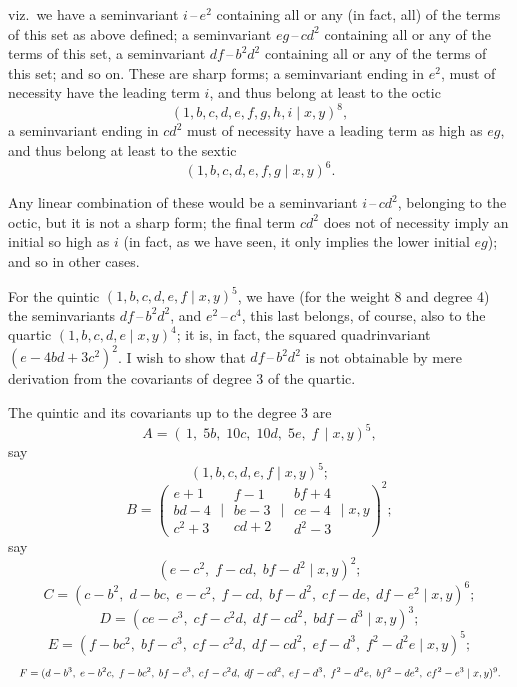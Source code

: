 \documentclass[11pt]{article}
\begin{document}
viz.\ we have a seminvariant $i\,\text{--}\,e^2$ containing all or any (in fact, all) of the terms of this set as above defined; a seminvariant $eg\,\text{--}\,cd^2$ containing all or any of the terms of this set, a seminvariant $df\,\text{--}\,b^2d^2$ containing all or any of the terms of this set; and so on. These are sharp forms; a seminvariant ending in $e^2$, must of necessity have the leading term $i$, and thus belong at least to the octic
\[ (1, b, c, d, e, f, g, h, i \mid x, y)^8, \]
a seminvariant ending in $cd^2$ must of necessity have a leading term as high as $eg$, and thus belong at least to the sextic
\[ (1, b, c, d, e, f, g \mid x, y)^6. \]

Any linear combination of these would be a seminvariant $i\,\text{--}\,cd^2$, belonging to the octic, but it is not a sharp form; the final term $cd^2$ does not of necessity imply an initial so high as $i$ (in fact, as we have seen, it only implies the lower initial $eg$); and so in other cases.

For the quintic $(1, b, c, d, e, f \mid x, y)^5$, we have (for the weight 8 and degree 4) the seminvariants $df\,\text{--}\,b^2d^2$, and $e^2\,\text{--}\,c^4$, this last belongs, of course, also to the quartic $(1, b, c, d, e \mid x, y)^4$; it is, in fact, the squared quadrinvariant $(e - 4bd + 3c^2)^2$. I wish to show that $df\,\text{--}\,b^2d^2$ is not obtainable by mere derivation from the covariants of degree 3 of the quartic.

The quintic and its covariants up to the degree 3 are
\[ A = (\,1,\;5b,\;10c,\;10d,\;5e,\;f\, \mid x, y)^5, \]
say
\[ (1, b, c, d, e, f \mid x, y)^5; \]
\[ B = \left(
\begin{array}{c} e + 1\\ bd - 4\\ c^2 + 3 \end{array}
\;\bigg|\;
\begin{array}{c} f - 1\\ be - 3\\ cd + 2 \end{array}
\;\bigg|\;
\begin{array}{c} bf + 4\\ ce - 4\\ d^2 - 3 \end{array}
\;\bigg|\; x, y\right)^2;
\]
say
\[ (e - c^2,\;f - cd,\;bf - d^2 \mid x, y)^2; \]
\[ C = (c - b^2,\;d - bc,\;e - c^2,\;f - cd,\;bf - d^2,\;cf - de,\;df - e^2 \mid x, y)^6; \]
\[ D = (ce - c^3,\;cf - c^2d,\;df - cd^2,\;bdf - d^3 \mid x, y)^3; \]
\[ E = (f - bc^2,\;bf - c^3,\;cf - c^2d,\;df - cd^2,\;ef - d^3,\;f^2 - d^2e \mid x, y)^5; \]
\[ \resizebox{\textwidth}{!}{$\displaystyle F = (d - b^3,\;e - b^2c,\;f - bc^2,\;bf - c^3,\;cf - c^2d,\;df - cd^2,\;ef - d^3,\;f^2 - d^2e,\;bf^2 - de^2,\;cf^2 - e^3 \mid x, y)^9.$} \]
\end{document}
